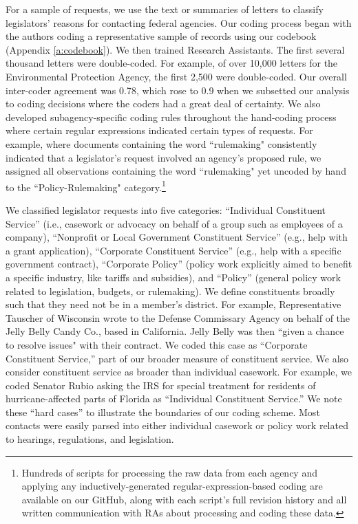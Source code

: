 \documentclass[12pt]{article}
\begin{document}
{For a sample of requests, we use the text or summaries of letters to classify legislators' reasons for contacting federal agencies. Our coding process began with the authors coding a representative sample of records using our codebook (Appendix \ref{a:codebook}). We then trained Research Assistants. The first several thousand letters were double-coded. For example, of over 10,000 letters for the Environmental Protection Agency, the first 2,500 were double-coded. Our overall inter-coder agreement was 0.78, which rose to 0.9 when we subsetted our analysis to coding decisions where the coders had a great deal of certainty. We also developed subagency-specific coding rules throughout the hand-coding process where certain regular expressions indicated certain types of requests. For example, where documents containing the word ``rulemaking" consistently indicated that a legislator's request involved an agency's proposed rule, we assigned all observations containing the word ``rulemaking" yet uncoded by hand to the ``Policy-Rulemaking" category.\footnote{Hundreds of scripts for processing the raw data from each agency and applying any inductively-generated regular-expression-based coding are available on our GitHub, along with each script's full revision history and all written communication with RAs about processing and coding these data.}

We classified legislator requests into five categories: ``Individual Constituent Service'' (i.e., casework or advocacy on behalf of a group such as employees of a company), ``Nonprofit or Local Government Constituent Service'' (e.g., help with a grant application), ``Corporate Constituent Service'' (e.g., help with a specific government contract), ``Corporate Policy'' (policy work explicitly aimed to benefit a specific industry, like tariffs and subsidies), and ``Policy'' (general policy work related to legislation, budgets, or rulemaking). We define constituents broadly such that they need not be in a member's district. For example, Representative Tauscher of Wisconsin wrote to the Defense Commissary Agency on behalf of the Jelly Belly Candy Co., based in California. Jelly Belly was then ``given a chance to resolve issues" with their contract. We coded this case as ``Corporate Constituent Service,'' part of our broader measure of constituent service. We also consider constituent service as broader than individual casework. For example, we coded Senator Rubio asking the IRS for special treatment for residents of hurricane-affected parts of Florida as ``Individual Constituent Service.'' We note these ``hard cases'' to illustrate the boundaries of our coding scheme. Most contacts were easily parsed into either individual casework or policy work related to hearings, regulations, and legislation.


}
\end{document}
